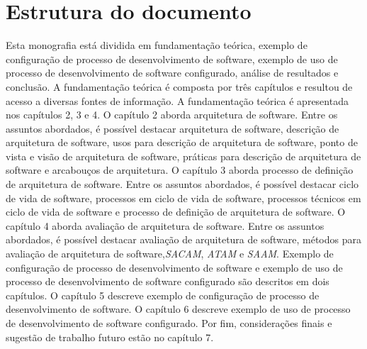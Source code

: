 \section{Estrutura do documento}

Esta monografia está dividida em fundamentação teórica, exemplo de configuração de processo de desenvolvimento de software, exemplo de uso de processo de desenvolvimento de software configurado, análise de resultados e conclusão. A fundamentação teórica é composta por três capítulos e resultou de acesso a diversas fontes de informação. A fundamentação teórica é apresentada nos capítulos 2, 3 e 4. O capítulo 2 aborda arquitetura de software. Entre os assuntos abordados, é possível destacar arquitetura de software, descrição de arquitetura de software, usos para descrição de arquitetura de software, ponto de vista e visão de arquitetura de software, práticas para descrição de arquitetura de software e arcabouços de arquitetura. O capítulo 3 aborda processo de definição de arquitetura de software. Entre os assuntos abordados, é possível destacar ciclo de vida de software, processos em ciclo de vida de software, processos técnicos em ciclo de vida de software e processo de definição de arquitetura de software. O capítulo 4 aborda avaliação de arquitetura de software. Entre os assuntos abordados, é possível destacar avaliação de arquitetura de software, métodos para avaliação de arquitetura de software,\emph{\acrfull{SACAM}}, \emph{\acrfull{ATAM}} e \emph{\acrfull{SAAM}}. Exemplo de configuração de processo de desenvolvimento de software e exemplo de uso de processo de desenvolvimento de software configurado são descritos em dois capítulos. O capítulo 5 descreve exemplo de configuração de processo de desenvolvimento de software. O capítulo 6 descreve exemplo de uso de processo de desenvolvimento de software configurado. Por fim, considerações finais e sugestão de trabalho futuro estão no capítulo 7.
